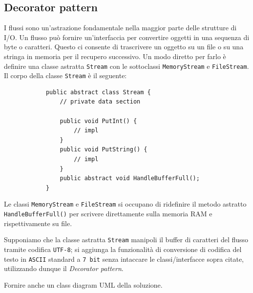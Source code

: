 \documentclass[12pt,a4paper]{article}
\begin{document}
    \subsection{Decorator pattern}\label{patter:decorator}
    \begin{Exercise}[origin={Ispirato ad un esempio del libro GoF}]
        I flussi sono un'astrazione fondamentale nella maggior parte delle strutture di I/O. Un flusso può fornire un'interfaccia per convertire oggetti in una sequenza di byte o caratteri. Questo ci consente di trascrivere un oggetto su un file o su una stringa in memoria per il recupero successivo. Un modo diretto per farlo è definire una classe astratta \texttt{Stream} con le sottoclassi \texttt{MemoryStream} e \texttt{FileStream}.
        Il corpo della classe \texttt{Stream} è il seguente:
        \begin{lstlisting}
            public abstract class Stream {
                // private data section
                
                public void PutInt() {
                    // impl
                }
                public void PutString() {
                    // impl
                }
                public abstract void HandleBufferFull();
            }
        \end{lstlisting}
        Le classi \texttt{MemoryStream} e \texttt{FileStream} si occupano di ridefinire il metodo astratto \texttt{HandleBufferFull()} per scrivere direttamente sulla memoria RAM e rispettivamente su file.
        
        Supponiamo che la classe astratta \texttt{Stream} manipoli il buffer di caratteri del flusso tramite codifica \texttt{UTF-8}; si aggiunga la funzionalità di conversione di codifica del testo in \texttt{ASCII} standard a \texttt{7 bit} senza intaccare le classi/interfacce sopra citate, utilizzando dunque il \textit{Decorator pattern}.

        Fornire anche un class diagram UML della soluzione.
    \end{Exercise}

\end{document}
